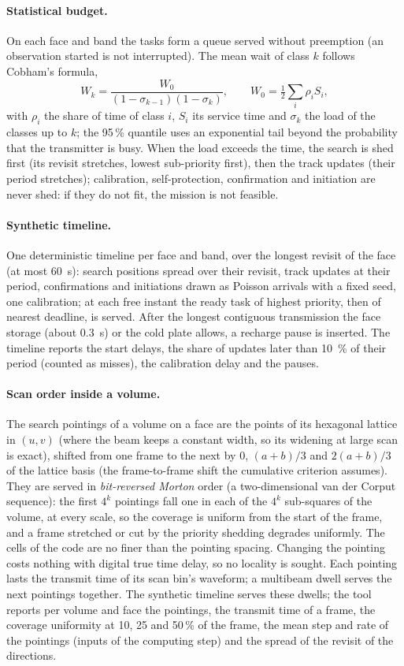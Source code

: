 \documentclass[11pt,a4paper]{article}
\begin{document}
\paragraph{Statistical budget.} On each face and band the tasks form a queue served without preemption (an observation
started is not interrupted). The mean wait of class $k$ follows Cobham's formula,
\[
  W_k = \frac{W_0}{(1-\sigma_{k-1})(1-\sigma_k)},\qquad W_0 = \tfrac12\textstyle\sum_i \rho_i S_i,
\]
with $\rho_i$ the share of time of class $i$, $S_i$ its service time and $\sigma_k$ the load of the classes up to $k$;
the 95\,\% quantile uses an exponential tail beyond the probability that the transmitter is busy. When the load exceeds
the time, the search is shed first (its revisit stretches, lowest sub-priority first), then the track updates (their
period stretches); calibration, self-protection, confirmation and initiation are never shed: if they do not fit, the
mission is not feasible.

\paragraph{Synthetic timeline.} One deterministic timeline per face and band, over the longest revisit of the face
(at most \SI{60}{s}): search positions spread over their revisit, track updates at their period, confirmations and
initiations drawn as Poisson arrivals with a fixed seed, one calibration; at each free instant the ready task of
highest priority, then of nearest deadline, is served. After the longest contiguous transmission the face storage
(about \SI{0.3}{s}) or the cold plate allows, a recharge pause is inserted. The timeline reports the start delays, the
share of updates later than \SI{10}{\percent} of their period (counted as misses), the calibration delay and the pauses.

\paragraph{Scan order inside a volume.} The search pointings of a volume on a face are the points of its hexagonal
lattice in $(u,v)$ (where the beam keeps a constant width, so its widening at large scan is exact), shifted from one
frame to the next by $0$, $(a+b)/3$ and $2(a+b)/3$ of the lattice basis (the frame-to-frame shift the cumulative
criterion assumes). They are served in \emph{bit-reversed Morton} order (a two-dimensional van der Corput sequence):
the first $4^k$ pointings fall one in each of the $4^k$ sub-squares of the volume, at every scale, so the coverage is
uniform from the start of the frame, and a frame stretched or cut by the priority shedding degrades uniformly. The
cells of the code are no finer than the pointing spacing. Changing the pointing costs nothing with digital true time
delay, so no locality is sought. Each pointing lasts the transmit time of its scan bin's waveform; a multibeam dwell
serves the next pointings together. The synthetic timeline serves these dwells; the tool reports per volume and face
the pointings, the transmit time of a frame, the coverage uniformity at 10, 25 and 50\,\% of the frame, the mean step
and rate of the pointings (inputs of the computing step) and the spread of the revisit of the directions.
\end{document}
